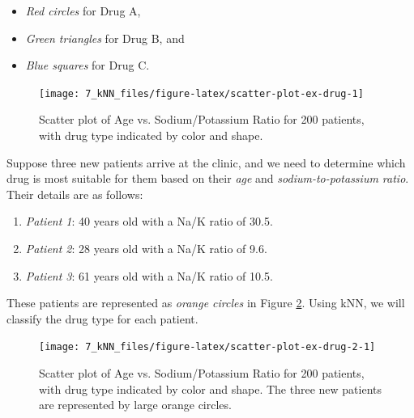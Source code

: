 \documentclass[
  11pt,
]{book}
\providecommand{\tightlist}{%
  \setlength{\itemsep}{0pt}\setlength{\parskip}{0pt}}
\theoremstyle{definition}
\theoremstyle{definition}
\theoremstyle{definition}
\theoremstyle{definition}
\theoremstyle{remark}
\begin{document}
\begin{itemize}
\tightlist
\item
  \emph{Red circles} for Drug A,\\
\item
  \emph{Green triangles} for Drug B, and\\
\item
  \emph{Blue squares} for Drug C.
\end{itemize}

\begin{figure}[H]

{\centering \texttt{[image: 7\_kNN\_files/figure-latex/scatter-plot-ex-drug-1]} 

}

\caption{Scatter plot of Age vs. Sodium/Potassium Ratio for 200 patients, with drug type indicated by color and shape.}\label{fig:scatter-plot-ex-drug}
\end{figure}

Suppose three new patients arrive at the clinic, and we need to determine which drug is most suitable for them based on their \emph{age} and \emph{sodium-to-potassium ratio}. Their details are as follows:

\begin{enumerate}
\def\labelenumi{\arabic{enumi}.}
\tightlist
\item
  \emph{Patient 1}: 40 years old with a Na/K ratio of 30.5.\\
\item
  \emph{Patient 2}: 28 years old with a Na/K ratio of 9.6.\\
\item
  \emph{Patient 3}: 61 years old with a Na/K ratio of 10.5.
\end{enumerate}

These patients are represented as \emph{orange circles} in Figure \ref{fig:scatter-plot-ex-drug-2}. Using kNN, we will classify the drug type for each patient.

\begin{figure}[H]

{\centering \texttt{[image: 7\_kNN\_files/figure-latex/scatter-plot-ex-drug-2-1]} 

}

\caption{Scatter plot of Age vs. Sodium/Potassium Ratio for 200 patients, with drug type indicated by color and shape. The three new patients are represented by large orange circles.}\label{fig:scatter-plot-ex-drug-2}
\end{figure}
\end{document}
